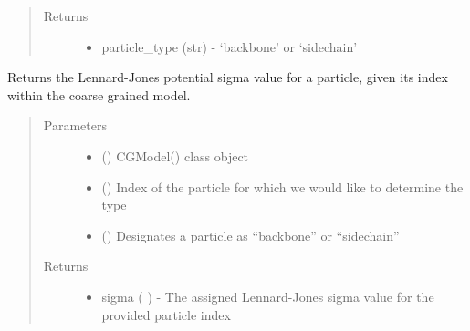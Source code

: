 \documentclass[letterpaper,12pt,english,openany,oneside]{sphinxmanual}
\begin{document}
\begin{fulllineitems}
\begin{fulllineitems}
\begin{quote}
\begin{description}
\begin{itemize}
\end{itemize}

\item[{Returns}] \leavevmode
\begin{itemize}
\item {} 
particle\_type (str) - ‘backbone’ or ‘sidechain’

\end{itemize}


\end{description}\end{quote}

\end{fulllineitems}


\begin{fulllineitems}
\label{\detokenize{cg_model:cg_model.cgmodel.CGModel.get_sigma}}
Returns the Lennard-Jones potential sigma value for a particle, given its index within the coarse grained model.
\begin{quote}\begin{description}
\item[{Parameters}] \leavevmode\begin{itemize}
\item {} 
 () \textendash{} CGModel() class object

\item {} 
 () \textendash{} Index of the particle for which we would like to determine the type

\item {} 
 () \textendash{} Designates a particle as “backbone” or “sidechain”

\end{itemize}

\item[{Returns}] \leavevmode
\begin{itemize}
\item {} 
sigma (  ) - The assigned Lennard-Jones sigma value for the provided particle index


\end{itemize}
\end{description}
\end{quote}
\end{fulllineitems}
\end{fulllineitems}
\end{document}
